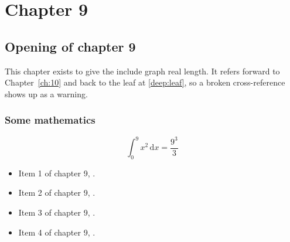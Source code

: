 \chapter{Chapter 9}
\label{ch:9}
\section{Opening of chapter 9}
This chapter exists to give the include graph real length. It refers
forward to Chapter~\ref{ch:10} and back to the leaf
at \ref{deep:leaf}, so a broken cross-reference shows up as a warning.

\subsection{Some mathematics}
\begin{equation}
  \int_0^{9} x^{2} \, \mathrm{d}x = \frac{9^{3}}{3}
\end{equation}

\begin{itemize}
  \item Item 1 of chapter 9, .
  \item Item 2 of chapter 9, .
  \item Item 3 of chapter 9, .
  \item Item 4 of chapter 9, .
\end{itemize}
